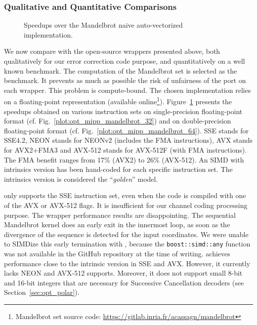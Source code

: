 \subsubsection{Qualitative and Quantitative Comparisons}

\begin{figure}[htp]
  \centering
  \quad
  \caption{Speedups over the Mandelbrot naive auto-vectorized implementation.}
  \label{plot:opt_mipp_mandelbrot}
\end{figure}

We now compare \MIPP with the open-source wrappers presented above, both
qualitatively for our error correction code purpose, and quantitatively on a
well known benchmark. The computation of the Mandelbrot set is selected as the
benchmark. It prevents as much as possible the risk of unfairness of the port on
each wrapper. This problem is compute-bound. The chosen implementation relies on
a floating-point representation (available online\footnote{Mandelbrot set source
code: \url{https://gitlab.inria.fr/acassagn/mandelbrot}}).
Figure~\ref{plot:opt_mipp_mandelbrot} presents the speedups obtained on various
instruction sets on single-precision floating-point format (cf.
Fig.~\ref{plot:opt_mipp_mandelbrot_32}) and on double-precision floating-point
format (cf. Fig.~\ref{plot:opt_mipp_mandelbrot_64}). SSE stands for SSE4.2, NEON
stands for NEONv2 (includes the FMA instructions), AVX stands for AVX2+FMA3 and
AVX-512 stands for AVX-512F (with FMA instructions). The FMA benefit ranges from
17\% (AVX2) to 26\% (AVX-512). An SIMD with intrinsics version has been
hand-coded for each specific instruction set. The intrinsics version is
considered the ``\emph{golden}'' model.

\textbf{\BoostSIMD} only supports the SSE instruction set, even when the code is
compiled with one of the AVX or AVX-512 flags. It is insufficient for our
channel coding processing purpose. The \BoostSIMD wrapper performance results
are disappointing. The sequential Mandelbrot kernel does an early exit in the
innermost loop, as soon as the divergence of the sequence is detected for the
input coordinates. We were unable to SIMDize this early termination with
\BoostSIMD, because the \verb|boost::simd::any| function was not available in
the GitHub repository at the time of writing. \textbf{\xsimd} achieves
performance close to the intrinsic version in SSE and AVX. However, it currently
lacks NEON and AVX-512 supports. Moreover, it does not support small 8-bit and
16-bit integers that are necessary for Successive Cancellation decoders (see
Section~\ref{sec:opt_polar}).

